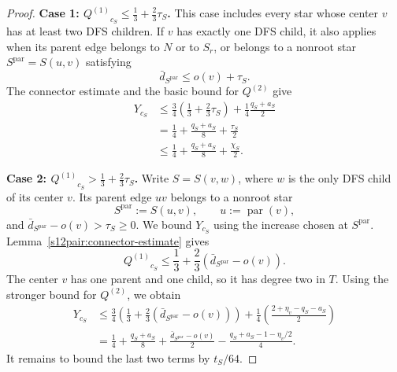 \documentclass[11pt]{amsart}
\newcommand{\1}{\mathbbm{1}}
\begin{document}
\begin{proof}
\smallskip\noindent
\smallskip\noindent
\textbf{Case 1: ${Q^{(1)}}_{c_S}\le\frac13+\frac23\tau_S$.}
This case includes every star whose center $v$ has at least
two DFS children. If $v$ has exactly one DFS child, it also
applies when its parent edge belongs to $N$ or to $S_r$,
or belongs to a nonroot star $S^{\mathrm{par}}=S(u,v)$ satisfying
\[
 \bar d_{S^{\mathrm{par}}}\le o(v)+\tau_S.
\]
The connector estimate and the basic bound for ${Q^{(2)}}$ give
\[
 \begin{aligned}
 Y_{c_S}
 &\le\frac34\left(\frac13+\frac23\tau_S\right)
       +\frac14\frac{q_S+a_S}{2}\\
 &=\frac14+\frac{q_S+a_S}{8}+\frac{\tau_S}{2}\\
 &\le\frac14+\frac{q_S+a_S}{8}+\frac{\chi_S}{2}.
 \end{aligned}
\]

\smallskip\noindent
\textbf{Case 2: ${Q^{(1)}}_{c_S}>\frac13+\frac23\tau_S$.}
Write $S=S(v,w)$, where $w$ is the only DFS child of its
center $v$. Its parent edge $uv$ belongs to a nonroot star
\[
 S^{\mathrm{par}}:=S(u,v),\qquad u:=\operatorname{par}(v),
\]
and $\bar d_{S^{\mathrm{par}}}-o(v)>\tau_S\ge0$.
We bound $Y_{c_S}$ using the increase chosen at $S^{\mathrm{par}}$.
Lemma~\ref{s12pair:connector-estimate} gives
\[
 {Q^{(1)}}_{c_S}\le\frac13+\frac23(\bar d_{S^{\mathrm{par}}}-o(v)).
\]
The center $v$ has one parent and one child, so it has degree two in $T$.
Using the stronger bound for ${Q^{(2)}}$, we obtain
\begin{equation}\label{s12pair:local-max}
 \begin{aligned}
 Y_{c_S}
 &\le\frac34\left(\frac13+\frac23(\bar d_{S^{\mathrm{par}}}-o(v))\right)
       +\frac14\left(\frac{2+\eta_v-q_S-a_S}{2}\right)\\
 &=\frac14+\frac{q_S+a_S}{8}
       +\frac{\bar d_{S^{\mathrm{par}}}-o(v)}{2}
       -\frac{q_S+a_S-1-\eta_v/2}{4}.
 \end{aligned}
\end{equation}
It remains to bound the last two terms by $t_S/64$.


\end{proof}
\end{document}
